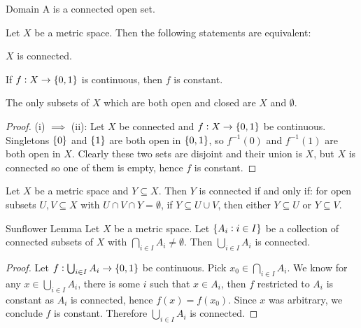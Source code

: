\documentclass{styles/tufte}
\begin{document}
\begin{definition}{Domain}{}
  A  is a connected open set.
\end{definition}

\begin{proposition}{}{}
  Let $X$ be a metric space. Then the following statements are equivalent:
  \begin{romanenum}
    \item $X$ is connected.
    \item If $f: X \to \set{0, 1}$ is continuous, then $f$ is constant.
    \item The only subsets of $X$ which are both open and closed are $X$ and $\emptyset$.
  \end{romanenum}
\end{proposition}
\begin{proof}
  (i) $\implies$ (ii): Let $X$ be connected and $f: X \to \set{0, 1}$ be continuous. Singletons $\set{0}$ and $\set{1}$ are both open in $\set{0, 1}$, so $f^{-1}(0)$ and $f^{-1}(1)$ are both open in $X$. Clearly these two sets are disjoint and their union is $X$, but $X$ is connected so one of them is empty, hence $f$ is constant.
\end{proof}

\begin{proposition}{}{}
  Let $X$ be a metric space and $Y \subseteq X$. Then $Y$ is connected if and only if: for open subsets $U, V \subseteq X$ with $U \cap V \cap Y = \emptyset$, if $Y \subseteq U \cup V$, then either $Y \subseteq U$ or $Y \subseteq V$.
\end{proposition}

\begin{lemma}{Sunflower Lemma}{}
  Let $X$ be a metric space. Let $\set{A_i: i \in I}$ be a collection of connected subsets of $X$ with $\bigcap_{i \in I} A_i \neq \emptyset$. Then $\bigcup_{i \in I} A_i$ is connected.
\end{lemma}
\begin{proof}
  Let $f: \bigcup_{i \in I} A_i \to \set{0, 1}$ be continuous. Pick $x_0 \in \bigcap_{i \in I} A_i$. We know for any $x \in \bigcup_{i \in I} A_i$, there is some $i$ such that $x \in A_i$, then $f$ restricted to $A_i$ is constant as $A_i$ is connected, hence $f(x) = f(x_0)$. Since $x$ was arbitrary, we conclude $f$ is constant. Therefore $\bigcup_{i \in I} A_i$ is connected.
\end{proof}
\end{document}
